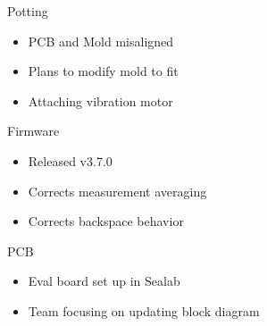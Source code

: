 \begin{frame}{Potting}
    \begin{itemize}
      \item PCB and Mold misaligned
      \item Plans to modify mold to fit
      \item Attaching vibration motor
    \end{itemize}
\end{frame}

\begin{frame}{Firmware}
  \begin{itemize}
    \item Released v3.7.0
    \item Corrects measurement averaging
    \item Corrects backspace behavior
  \end{itemize}
\end{frame}

\begin{frame}{PCB}
  \begin{itemize}
    \item Eval board set up in Sealab
    \item Team focusing on updating block diagram
  \end{itemize}
\end{frame}



